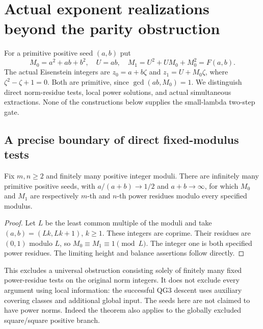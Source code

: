 \section{Actual exponent realizations beyond the parity obstruction}
\label{lp-section}

For a primitive positive seed $(a,b)$ put
\[
 M_0=a^2+ab+b^2,\quad U=ab,\quad
 M_1=U^2+UM_0+M_0^2=F(a,b).
\]
The actual Eisenstein integers are $z_0=a+b\zeta$ and
$z_1=U+M_0\zeta$, where $\zeta^2-\zeta+1=0$.
Both are primitive, since $\gcd(ab,M_0)=1$.
We distinguish direct norm-residue tests, local power solutions, and
actual simultaneous extractions. None of the constructions below
supplies the small-lambda two-step gate.

\subsection{A precise boundary of direct fixed-modulus tests}

\begin{theorem}\label{lp-residues}
Fix $m,n\ge2$ and finitely many positive integer moduli. There are
infinitely many primitive positive seeds, with $a/(a+b)\to1/2$ and
$a+b\to\infty$, for which $M_0$ and $M_1$ are respectively $m$-th
and $n$-th power residues modulo every specified modulus.
\end{theorem}
\begin{proof}
Let $L$ be the least common multiple of the moduli and take
$(a,b)=(Lk,Lk+1)$, $k\ge1$. These integers are coprime. Their
residues are $(0,1)$ modulo $L$, so $M_0\equiv M_1\equiv1\pmod L$.
The integer one is both specified power residues. The limiting height
and balance assertions follow directly.
\end{proof}
This excludes a universal obstruction consisting solely of finitely many
fixed power-residue tests on the original norm integers. It does not
exclude every argument using local information: the successful QG3
descent uses auxiliary covering classes and additional global input.
The seeds here are not claimed to have power norms. Indeed the theorem
also applies to the globally excluded square/square positive branch.

